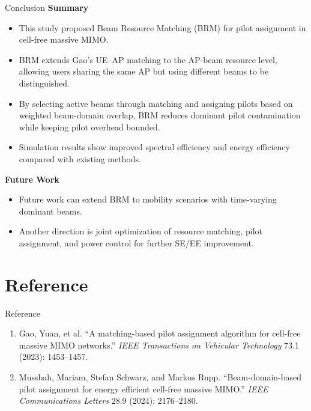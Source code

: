 \documentclass[10pt,aspectratio=169]{beamer}
\newenvironment{tightitemize}{%
    \begin{itemize}
        \setlength{\itemsep}{2pt}
        \setlength{\parskip}{0pt}
        \setlength{\parsep}{0pt}
}{%
    \end{itemize}
}
\begin{document}
\begin{frame}{Conclusion}
    \footnotesize
    \vspace{-0.4em}
    \textbf{Summary}
    \begin{tightitemize}
        \item This study proposed Beam Resource Matching (BRM) for pilot assignment in cell-free massive MIMO.
        \item BRM extends Gao's UE--AP matching to the AP-beam resource level, allowing users sharing the same AP but using different beams to be distinguished.
        \item By selecting active beams through matching and assigning pilots based on weighted beam-domain overlap, BRM reduces dominant pilot contamination while keeping pilot overhead bounded.
        \item Simulation results show improved spectral efficiency and energy efficiency compared with existing methods.
    \end{tightitemize}
    
    \vspace{0.45em}
    \textbf{Future Work}
    \begin{tightitemize}
        \item Future work can extend BRM to mobility scenarios with time-varying dominant beams.
        \item Another direction is joint optimization of resource matching, pilot assignment, and power control for further SE/EE improvement.
    \end{tightitemize}
\end{frame}

\section{Reference}

\begin{frame}{Reference}
    \small
    \begin{enumerate}
        \item Gao, Yuan, et al. ``A matching-based pilot assignment algorithm for cell-free massive MIMO networks.'' \emph{IEEE Transactions on Vehicular Technology} 73.1 (2023): 1453--1457.
        \item Mussbah, Mariam, Stefan Schwarz, and Markus Rupp. ``Beam-domain-based pilot assignment for energy efficient cell-free massive MIMO.'' \emph{IEEE Communications Letters} 28.9 (2024): 2176--2180.
    \end{enumerate}
\end{frame}
\end{document}
